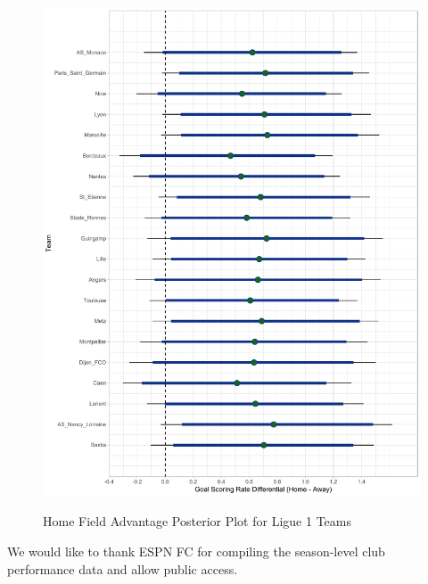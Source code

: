 \documentclass[USenglish]{article}
\begin{document}
\begin{figure}
\caption{Home Field Advantage Posterior Plot for Ligue 1 Teams}
{\includegraphics[width=0.90\linewidth]{HFA_Ligue111.pdf}}
\label{fig5}
\end{figure}



\begin{acknowledgement}

We would like to thank ESPN FC for compiling the season-level club performance data and allow public access.

\end{acknowledgement}

\newpage

%

\end{document}
